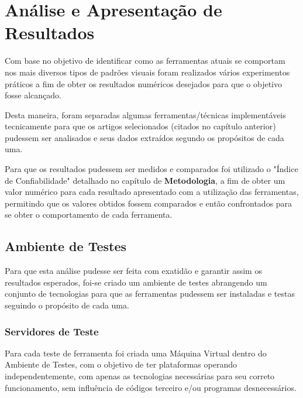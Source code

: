 
\chapter{Análise e Apresentação de Resultados}


Com base no objetivo de identificar como as ferramentas atuais se comportam nos mais diversos tipos de padrões visuais foram realizados vários experimentos práticos a fim de obter os resultados numéricos desejados para que o objetivo fosse alcançado.

Desta maneira, foram separadas algumas ferramentas/técnicas implementáveis tecnicamente para que os artigos selecionados (citados no capítulo anterior) pudessem ser analisados e seus dados extraídos segundo os propósitos de cada uma.


Para que os resultados pudessem ser medidos e comparados foi utilizado o "Índice de Confiabilidade" detalhado no capítulo de \textbf{Metodologia}, a fim de obter um valor numérico para cada resultado apresentado com a utilização das ferramentas, permitindo que os valores obtidos fossem comparados e então confrontados para se obter o comportamento de cada ferramenta.



\section{Ambiente de Testes}

Para que esta análise pudesse ser feita com exatidão e garantir assim os resultados esperados, foi-se criado um ambiente de testes abrangendo um conjunto de tecnologias para que as ferramentas pudessem ser instaladas e testas seguindo o propósito de cada uma.

\subsection{Servidores de Teste}

Para cada teste de ferramenta foi criada uma Máquina Virtual dentro do Ambiente de Testes, com o objetivo de ter plataformas operando independentemente, com apenas as tecnologias necessárias para seu correto funcionamento, sem influência de códigos terceiro e/ou programas desnecessários.

